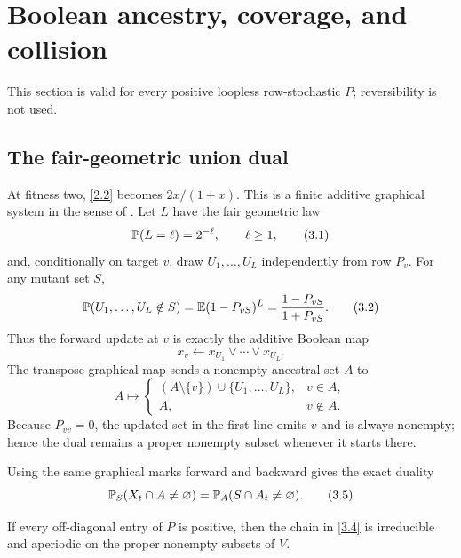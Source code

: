 \section{Boolean ancestry, coverage, and collision}\label{sec:duality}

This section is valid for every positive loopless row-stochastic $P$;
reversibility is not used.

\subsection{The fair-geometric union dual}

At fitness two, \eqref{2.2} becomes $2x/(1+x)$.  This is a finite additive
graphical system in the sense of \citet{Harris1978}.  Let $L$ have the fair
geometric law
\[
 \mathbb P(L=\ell)=2^{-\ell},\qquad \ell\ge1,                       \tag{3.1}\label{3.1}
\]
and, conditionally on target $v$, draw $U_1,\ldots,U_L$
independently from row $P_v$.  For any mutant set $S$,
\[
 \mathbb P(U_1,\ldots,U_L\notin S)
 =\mathbb E(1-P_{vS})^L=\frac{1-P_{vS}}{1+P_{vS}}.                  \tag{3.2}\label{3.2}
\]
Thus the forward update at $v$ is exactly the additive Boolean map
\[
 x_v\longleftarrow x_{U_1}\vee\cdots\vee x_{U_L}.           \tag{3.3}\label{3.3}
\]
The transpose graphical map sends a nonempty ancestral set $A$ to
\[
 A\longmapsto
 \begin{cases}
 (A\setminus\{v\})\cup\{U_1,\ldots,U_L\},&v\in A,\\
 A,&v\notin A.
 \end{cases}                                                 \tag{3.4}\label{3.4}
\]
Because $P_{vv}=0$, the updated set in the first line omits $v$ and is
always nonempty; hence the dual remains a proper nonempty subset whenever it
starts there.

Using the same graphical marks forward and backward gives the exact duality
\[
 \mathbb P_S(X_t\cap A\ne\varnothing)
 =\mathbb P_A(S\cap A_t\ne\varnothing).                            \tag{3.5}\label{3.5}
\]

\begin{lemma}\label{lem:dual-ergodic}
If every off-diagonal entry of $P$ is positive, then the chain in
\eqref{3.4} is irreducible and aperiodic on the proper nonempty subsets of
$V$.
\end{lemma}

